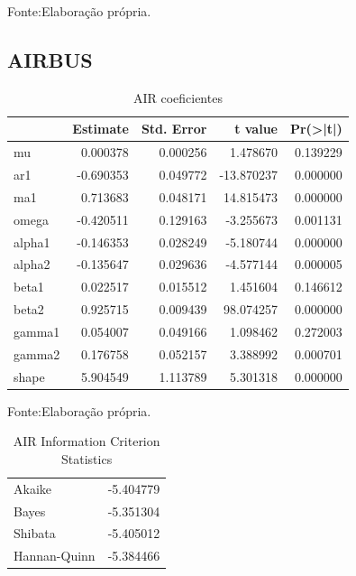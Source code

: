 \documentclass[
  12pt,
  a4paper,
  openany]{book}
\begin{document}
Fonte:Elaboração própria.

\justifying
\bigskip

\hypertarget{airbus}{%
\subsection{AIRBUS}\label{airbus}}

\begin{table}[!h]

\caption{\label{tab:unnamed-chunk-31}AIR coeficientes}
\centering
\begin{tabular}[t]{lrrrr}
\toprule
  &  Estimate &  Std. Error &  t value & Pr(>|t|)\\
\midrule
mu & 0.000378 & 0.000256 & 1.478670 & 0.139229\\
ar1 & -0.690353 & 0.049772 & -13.870237 & 0.000000\\
ma1 & 0.713683 & 0.048171 & 14.815473 & 0.000000\\
omega & -0.420511 & 0.129163 & -3.255673 & 0.001131\\
alpha1 & -0.146353 & 0.028249 & -5.180744 & 0.000000\\
\addlinespace
alpha2 & -0.135647 & 0.029636 & -4.577144 & 0.000005\\
beta1 & 0.022517 & 0.015512 & 1.451604 & 0.146612\\
beta2 & 0.925715 & 0.009439 & 98.074257 & 0.000000\\
gamma1 & 0.054007 & 0.049166 & 1.098462 & 0.272003\\
gamma2 & 0.176758 & 0.052157 & 3.388992 & 0.000701\\
\addlinespace
shape & 5.904549 & 1.113789 & 5.301318 & 0.000000\\
\bottomrule
\end{tabular}
\end{table}
\FloatBarrier
\centering

Fonte:Elaboração própria.

\justifying
\bigskip

\begin{table}[!h]

\caption{\label{tab:unnamed-chunk-32}AIR Information Criterion Statistics}
\centering
\begin{tabular}[t]{lr}
\toprule
  & \\
\midrule
Akaike & -5.404779\\
Bayes & -5.351304\\
Shibata & -5.405012\\
Hannan-Quinn & -5.384466\\
\bottomrule
\end{tabular}
\end{table}
\FloatBarrier
\centering
\end{document}
